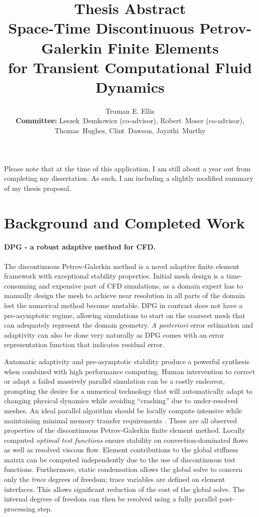 \documentclass[letterpaper,12pt]{article}
\title{Thesis Abstract \\ \vspace{2 mm} {\large Space-Time Discontinuous Petrov-Galerkin Finite Elements \\for Transient Computational Fluid Dynamics}}
\author{Truman E. Ellis\\
\small \textbf{Committee:} Leszek~Demkowicz (co-advisor), Robert~Moser (co-advisor), \\Thomas~Hughes, Clint~Dawson, Jayathi~Murthy}
\date{}
\begin{document}
\maketitle
Please note that at the time of this application, I am still about a year out from completing my dissertation. As such, I am including a slightly modified summary of my thesis proposal.

\section*{Background and Completed Work}
\paragraph{DPG - a robust adaptive method for CFD.}
The discontinuous Petrov-Galerkin method \cite{DPGOverview} is a novel adaptive finite element framework with exceptional stability properties.
Initial mesh design is a time-consuming and expensive part of CFD simulations, as a domain expert has to manually design the 
mesh to achieve near resolution in all parts of the domain lest the numerical method become unstable.
DPG in contrast does not have a pre-asymptotic regime, allowing simulations to start on the coarsest mesh that can adequately represent the domain geometry.
\emph{A posteriori} error estimation and adaptivity can also be done very naturally as DPG comes with an error representation function 
that indicates residual error.

Automatic adaptivity and pre-asymptotic stability produce a powerful synthesis when combined with high performance computing.
Human intervention to correct or adapt a failed massively parallel simulation can be a costly endeavor, prompting the desire for a
numerical technology that will automatically adapt to changing physical dynamics while avoiding ``crashing'' due to under-resolved meshes.
An ideal parallel algorithm should be locally compute intensive while maintaining minimal memory transfer requirements \cite{BlastWebPage}.
These are all observed properties of the discontinuous Petrov-Galerkin finite element method.
Locally computed \emph{optimal test functions} ensure stability on convection-dominated flows as well as resolved viscous flow.
Element contributions to the global stiffness matrix can be computed independently due to the use of discontinuous test functions.
Furthermore, static condensation allows the global solve to concern only the \emph{trace} degrees of freedom; 
trace variables are defined on element interfaces.  
This allows significant reduction of the cost of the global solve.  
The internal degrees of freedom can then be resolved using a fully parallel post-processing step.
\end{document}
